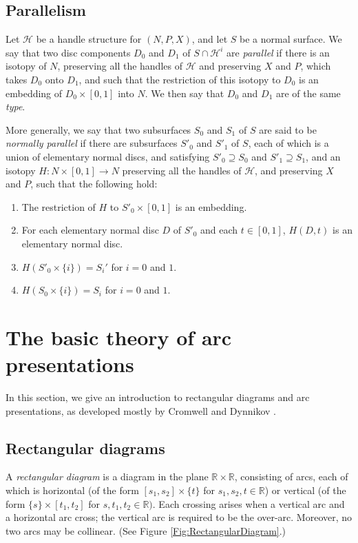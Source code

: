 \documentclass[oneside]{amsart}
\numberwithin{equation}{section}
\theoremstyle{plain}
\theoremstyle{definition}
\newcommand{\calH}{\mathcal{H}}
\begin{document}
\subsection{Parallelism}

Let $\mathcal{H}$ be a handle structure for $(N,P, X)$, and let $S$ be a normal surface.
We say that two disc components $D_0$ and $D_1$ of $S \cap \mathcal{H}^i$ are
\emph{parallel} if there is an isotopy of $N$, preserving all the handles of $\mathcal{H}$
and preserving $X$ and $P$, which takes $D_0$ onto $D_1$, and such that the
restriction of this isotopy to $D_0$ is an embedding of $D_0 \times [0,1]$
into $N$. We then say that $D_0$ and $D_1$ are of the same \emph{type}.

More generally, we say that two subsurfaces $S_0$ and $S_1$ of $S$ are said to
be \emph{normally parallel} if there are subsurfaces $S'_0$ and $S'_1$ of $S$,
each of which is a union of elementary normal discs, and satisfying
$S'_0 \supseteq S_0$ and $S'_1 \supseteq S_1$, and an isotopy $H \colon N \times [0,1] \rightarrow N$
preserving all the handles of $\calH$, and preserving $X$ and $P$, such that the following hold:
\begin{enumerate}
\item The restriction of $H$ to $S'_0 \times [0,1]$ is an embedding.
\item For each elementary normal disc $D$ of $S'_0$ and each $t \in [0,1]$,
$H(D,t)$ is an elementary normal disc.
\item $H(S'_0 \times \{ i \}) = S_i'$ for $i =0$ and $1$.
\item $H(S_0 \times \{ i \}) = S_i$ for $i =0$ and $1$.
\end{enumerate}



\section{The basic theory of arc presentations}
\label{Sec:ArcPresentations}

In this section, we give an introduction to rectangular diagrams and arc presentations, as
developed mostly by Cromwell \cite{Cromwell} and Dynnikov \cite{Dynnikov}.

\subsection{Rectangular diagrams}

A \emph{rectangular diagram} is a diagram in the plane $\mathbb{ R} \times \mathbb{ R}$,
consisting of arcs, each of which is horizontal (of the form $[s_1, s_2] \times \{ t \}$ for
$s_1, s_2, t \in \mathbb{ R}$) or vertical (of the form $\{ s \} \times [t_1, t_2]$ for $s, t_1, t_2 \in \mathbb{ R})$.
Each crossing arises when a vertical arc and a horizontal arc cross; the vertical arc is
required to be the over-arc. Moreover, no two arcs may be collinear. (See Figure 
\ref{Fig:RectangularDiagram}.)
\end{document}
